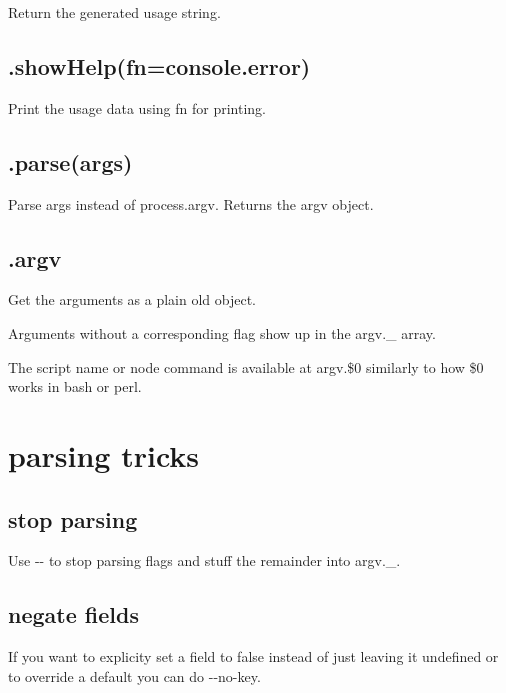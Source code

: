 Return the generated usage string.

\subsection*{.show\+Help(fn=console.\+error) }

Print the usage data using {\ttfamily fn} for printing.

\subsection*{.parse(args) }

Parse {\ttfamily args} instead of {\ttfamily process.\+argv}. Returns the {\ttfamily argv} object.

\subsection*{.argv }

Get the arguments as a plain old object.

Arguments without a corresponding flag show up in the {\ttfamily argv.\+\_\+} array.

The script name or node command is available at {\ttfamily argv.\$0} similarly to how {\ttfamily \$0} works in bash or perl.

\section*{parsing tricks }

\subsection*{stop parsing }

Use {\ttfamily -\/-\/} to stop parsing flags and stuff the remainder into {\ttfamily argv.\+\_\+}. 


\subsection*{negate fields }

If you want to explicity set a field to false instead of just leaving it undefined or to override a default you can do {\ttfamily -\/-\/no-\/key}. 


